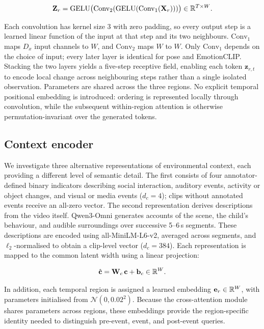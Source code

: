\begin{equation}
  \mathbf{Z}_r = \operatorname{GELU}\!\big(\mathrm{Conv}_2(\operatorname{GELU}(\mathrm{Conv}_1(\mathbf{X}_r)))\big)\in\mathbb{R}^{T\times W}.
\end{equation}

Each convolution has kernel size 3 with zero padding, so every output step is a learned linear function of the input at that step and its two neighbours. $\mathrm{Conv}_1$ maps $D_x$ input channels to $W$, and $\mathrm{Conv}_2$ maps $W$ to $W$. Only $\mathrm{Conv}_1$ depends on the choice of input; every later layer is identical for pose and EmotionCLIP. Stacking the two layers yields a five-step receptive field, enabling each token $\mathbf{z}_{r,t}$ to encode local change across neighbouring steps rather than a single isolated observation. Parameters are shared across the three regions. No explicit temporal positional embedding is introduced: ordering is represented locally through convolution, while the subsequent within-region attention is otherwise permutation-invariant over the generated tokens.

\subsection{Context encoder}
\label{sec:context}

We investigate three alternative representations of environmental context, each providing a different level of semantic detail. The first consists of four annotator-defined binary indicators describing social interaction, auditory events, activity or object changes, and visual or media events ($d_c=4$); clips without annotated events receive an all-zero vector. The second representation derives descriptions from the video itself. Qwen3-Omni generates accounts of the scene, the child's behaviour, and audible surroundings over successive 5--6\,s segments. These descriptions are encoded using all-MiniLM-L6-v2, averaged across segments, and $\ell_2$-normalised to obtain a clip-level vector ($d_c=384$). Each representation is mapped to the common latent width using a linear projection:

\begin{equation}
  \hat{\mathbf{c}} = \mathbf{W}_c\,\mathbf{c} + \mathbf{b}_c\in\mathbb{R}^{W}.
\end{equation}

In addition, each temporal region is assigned a learned embedding $\mathbf{e}_r\in\mathbb{R}^W$, with parameters initialised from $\mathcal{N}(0,0.02^2)$. Because the cross-attention module shares parameters across regions, these embeddings provide the region-specific identity needed to distinguish pre-event, event, and post-event queries.

